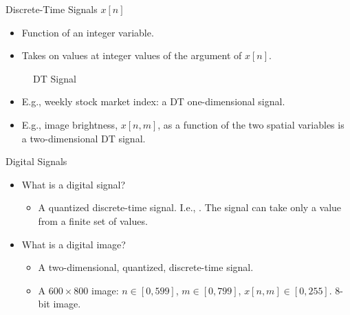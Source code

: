 %




\begin{frame}[plain]{Discrete-Time Signals $x[n]$}
    \begin{itemize}
        \item Function of an integer variable.
        \item Takes on values at integer values of the argument of $x[n]$.
    \end{itemize}
    \begin{figure}
      \centering
      
      \caption{DT Signal}\label{fi:dt_signal}
    \end{figure}
    \begin{itemize}
        \item E.g., weekly stock market index: a DT one-dimensional signal.
        \item E.g., image brightness,  $x[n,m]$,  as a function of the two spatial variables is a two-dimensional DT signal.
    \end{itemize}
\end{frame}

\begin{frame}{Digital Signals}
    \begin{itemize}
      \item What is a digital signal?
        \begin{itemize}
            \item A quantized discrete-time signal. I.e., . The signal can take only a value from a finite set of values.
        \end{itemize}

      \item What is a digital image?
        \begin{itemize}
            \item A two-dimensional, quantized, discrete-time signal.
            \item A $600 \times 800$ image: $n \in [0, 599]$, $m \in [0, 799]$, $x[n,m] \in [0,255]$. 8-bit image.
        \end{itemize}
    \end{itemize}
\end{frame}

